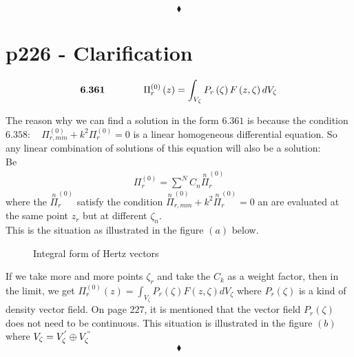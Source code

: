  $$\blacklozenge$$
\newpage



\section{p226 - Clarification}
\begin{tcolorbox}
 $$\mathbf{6.361}\quad\quad\quad\quad \Pi^{(0)}_r\left(z\right)= \int_{V_{\zeta}}P_r\left(\zeta\right)F\left(z, \zeta\right)dV_{\zeta}$$
\end{tcolorbox}
The reason why we can find a solution in the form $\mathbf{6.361}$ is because the condition $\mathbf{6.358}: \quad \Pi^{(0)}_{r,mm}+ k^2 \Pi^{(0)}_r = 0$ is a linear homogeneous differential equation. So any linear combination of solutions of this equation will also be a solution:\\
Be
\begin{align}
\Pi^{(0)}_r = \overset{N}{\sum} C_n\overset{n}{\Pi}^{(0)}_r
\end{align}
where the $\overset{n}{\Pi}^{(0)}_r$ satisfy the condition  $\overset{n}{\Pi}^{(0)}_{r,mm}+ k^2 \overset{n}{\Pi}^{(0)}_r = 0$ an are evaluated at the same point $z_r$ but at different $\zeta_n$.\\
This is the situation as illustrated in the figure $(a)$ below.
\begin{figure}[H]%
    \centering
    \subfloat[]{}
    \quad
     \subfloat[]{}
\caption{Integral form of Hertz vectors }
\label{fig:fig_p221}
\end{figure}
If we take more and more points $\zeta_r$ and take the $C_k$ as a weight  factor, then in the limit, we get $\Pi^{(0)}_r\left(z\right)= \int_{V_{\zeta}}P_r\left(\zeta\right)F\left(z, \zeta\right)dV_{\zeta}$ where $P_r\left(\zeta\right)$ is a kind of density vector field.
On page $227$, it is mentioned that the vector field $P_r\left(\zeta\right)$ does not need to be continuous. This situation is illustrated in the figure $(b)$  where $V_{\zeta} =  V^{'}_{\zeta}\oplus V^{"}_{\zeta}$
 $$\blacklozenge$$
\newpage



